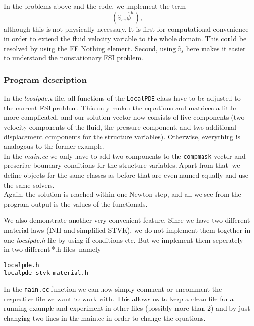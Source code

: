 \begin{remark}
In the problems above and the code, we implement the term
\[
(\hat v_s, \hat\phi^u),
\]
although this is not physically necessary. It is first for computational
convenience in order to extend the fluid velocity variable to the whole
domain.
This could be resolved by using the FE Nothing element. Second, 
using $\hat v_s$ here makes it easier to understand the 
nonstationary FSI problem.
\end{remark}

\subsubsection{Program description}

In the \textit{localpde.h} file, all functions of the \texttt{LocalPDE} class have to be adjusted to the current FSI problem. This only makes the equations and matrices a little more complicated, and our solution vector now consists of five components (two velocity components of the fluid, the pressure component, and two additional displacement components for the structure variables). Otherwise, everything is analogous to the former example.\\
In the \textit{main.cc} we only have to add two components to the \texttt{compmask} vector and prescribe boundary conditions for the structure variables. Apart from that, we define objects for the same classes as before that are even named equally and use the same solvers.\\ 
Again, the solution is reached within one Newton step, and all we see from the
program output is the values of the functionals.

We also demonstrate another very convenient feature. Since we have 
two different material laws (INH and simplified STVK), we do not implement 
them together in one \textit{localpde.h} file by using if-conditions etc. 
But we implement them seperately in two different *.h files, namely
\begin{lstlisting}
localpde.h
localpde_stvk_material.h
\end{lstlisting}
In the \texttt{main.cc} function we can now simply comment 
or uncomment the respective file we want to work with.
This allows us to keep a clean file for a running example and experiment 
in other files (possibly more than $2$) and by just changing 
two lines in the main.cc in order to change the equations.
